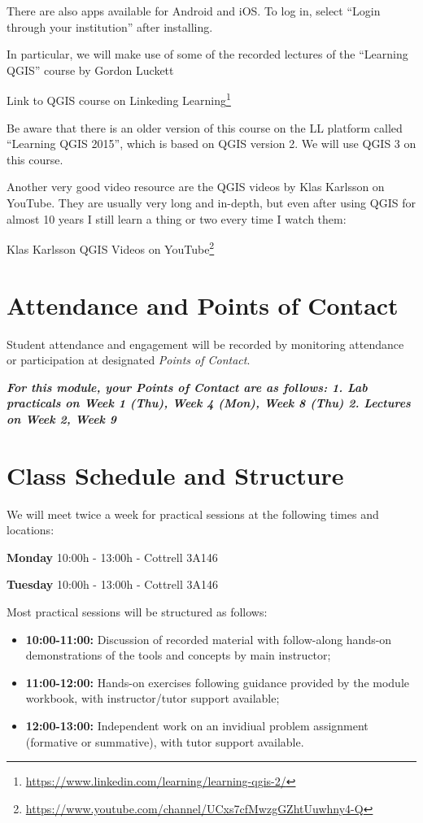 \documentclass[
]{book}
\providecommand{\tightlist}{%
  \setlength{\itemsep}{0pt}\setlength{\parskip}{0pt}}
\renewcommand{\href}[2]{#2\footnote{\url{#1}}}
\begin{document}
There are also apps available for Android and iOS. To log in, select ``Login through your institution'' after installing.

In particular, we will make use of some of the recorded lectures of the ``Learning QGIS'' course by Gordon Luckett

\href{https://www.linkedin.com/learning/learning-qgis-2/}{Link to QGIS course on Linkeding Learning}

Be aware that there is an older version of this course on the LL platform called ``Learning QGIS 2015'', which is based on QGIS version 2. We will use QGIS 3 on this course.

Another very good video resource are the QGIS videos by Klas Karlsson on YouTube. They are usually very long and in-depth, but even after using QGIS for almost 10 years I still learn a thing or two every time I watch them:

\href{https://www.youtube.com/channel/UCxs7cfMwzgGZhtUuwhny4-Q}{Klas Karlsson QGIS Videos on YouTube}

\hypertarget{attendance-and-points-of-contact}{%
\section{Attendance and Points of Contact}\label{attendance-and-points-of-contact}}

Student attendance and engagement will be recorded by monitoring attendance or participation at designated \emph{Points of Contact}.

\textbf{\emph{For this module, your Points of Contact are as follows:
1. Lab practicals on Week 1 (Thu), Week 4 (Mon), Week 8 (Thu) 2. Lectures on
Week 2, Week 9 }}

\hypertarget{class-schedule-and-structure}{%
\section{Class Schedule and Structure}\label{class-schedule-and-structure}}

We will meet twice a week for practical sessions at the following times and locations:

\textbf{Monday} 10:00h - 13:00h - Cottrell 3A146

\textbf{Tuesday} 10:00h - 13:00h - Cottrell 3A146

Most practical sessions will be structured as follows:

\begin{itemize}
\tightlist
\item
  \textbf{10:00-11:00:} Discussion of recorded material with follow-along hands-on demonstrations of the tools and concepts by main instructor;
\item
  \textbf{11:00-12:00:} Hands-on exercises following guidance provided by the module workbook, with instructor/tutor support available;
\item
  \textbf{12:00-13:00:} Independent work on an invidiual problem assignment (formative or summative), with tutor support available.
\end{itemize}
\end{document}

